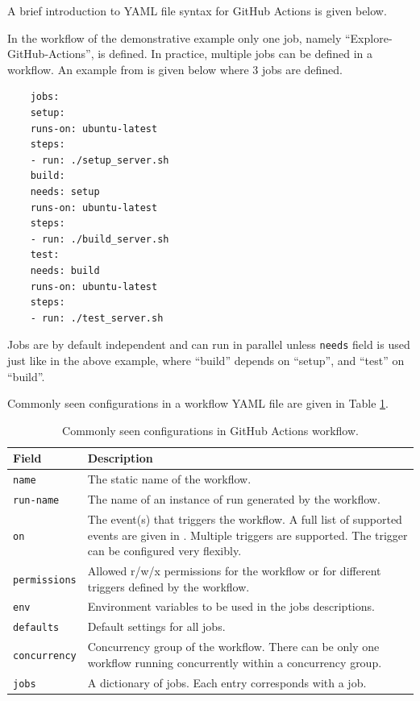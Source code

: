 A brief introduction to YAML file syntax for GitHub Actions is given below.

In the workflow of the demonstrative example only one job, namely ``Explore-GitHub-Actions'', is defined. In practice, multiple jobs can be defined in a workflow. An example from \cite{git2025reference} is given below where 3 jobs are defined.
\begin{lstlisting}
	jobs:
	setup:
	runs-on: ubuntu-latest
	steps:
	- run: ./setup_server.sh
	build:
	needs: setup
	runs-on: ubuntu-latest
	steps:
	- run: ./build_server.sh
	test:
	needs: build
	runs-on: ubuntu-latest
	steps:
	- run: ./test_server.sh
\end{lstlisting}
Jobs are by default independent and can run in parallel unless \verb|needs| field is used just like in the above example, where ``build'' depends on ``setup'', and ``test'' on ``build''.

Commonly seen configurations in a workflow YAML file are given in Table \ref{tab:githubactions_workflow}.
\begin{table}[!htb]
	\centering \caption{Commonly seen configurations in GitHub Actions workflow.}\label{tab:githubactions_workflow}
	\begin{tabularx}{\textwidth}{lX}
		\hline
		Field & Description \\ \hline
		\texttt{name} & The static name of the workflow.  \\ 
		\texttt{run-name} & The name of an instance of run generated by the workflow.  \\ 
		\texttt{on} & The event(s) that triggers the workflow. A full list of supported events are given in \cite{git2025reference}. Multiple triggers are supported. The trigger can be configured very flexibly. \\ 
		\texttt{permissions} & Allowed r/w/x permissions for the workflow or for different triggers defined by the workflow. \\ 
		\texttt{env} & Environment variables to be used in the jobs descriptions. \\
		\texttt{defaults} & Default settings for all jobs. \\
		\texttt{concurrency} & Concurrency group of the workflow. There can be only one workflow running concurrently within a concurrency group. \\
		\texttt{jobs} & A dictionary of jobs. Each entry corresponds with a job. \\
		\hline
	\end{tabularx}
\end{table}

